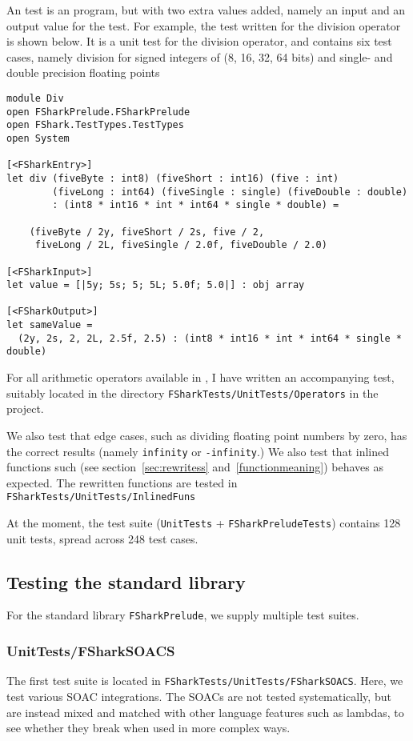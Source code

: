 An \fshark{} test is an \fshark{} program, but with two extra values added,
namely an input and an output value for the test. For example, the test written for the
division operator is shown below. It is a unit test for the division operator,
and contains six test cases, namely division for signed integers of (8, 16, 32,
64 bits) and single- and double precision floating points
\begin{verbatim}
module Div
open FSharkPrelude.FSharkPrelude
open FShark.TestTypes.TestTypes
open System

[<FSharkEntry>]
let div (fiveByte : int8) (fiveShort : int16) (five : int) 
        (fiveLong : int64) (fiveSingle : single) (fiveDouble : double) 
        : (int8 * int16 * int * int64 * single * double) =

    (fiveByte / 2y, fiveShort / 2s, five / 2, 
     fiveLong / 2L, fiveSingle / 2.0f, fiveDouble / 2.0)

[<FSharkInput>]
let value = [|5y; 5s; 5; 5L; 5.0f; 5.0|] : obj array

[<FSharkOutput>]
let sameValue = 
  (2y, 2s, 2, 2L, 2.5f, 2.5) : (int8 * int16 * int * int64 * single * double)
\end{verbatim}
For all arithmetic operators available in \fshark{}, I have written an
accompanying test, suitably located in the directory
\texttt{FSharkTests/UnitTests/Operators} in the \fshark{} project.

We also test that edge cases, such as dividing floating point numbers by zero,
has the correct results (namely \texttt{infinity} or \texttt{-infinity}.)
We also test that \fshark{} inlined functions such (see
section~\ref{sec:rewritess} and~\ref{functionmeaning}) behaves as expected.
The rewritten functions are tested in \texttt{FSharkTests/UnitTests/InlinedFuns}

At the moment, the \fshark{} test suite (\texttt{UnitTests} +
\texttt{FSharkPreludeTests}) contains 128 unit tests, spread across 248 test cases.


\subsection{Testing the \fshark{} standard library}
For the \fshark{} standard library \texttt{FSharkPrelude}, we supply multiple
test suites.
\subsubsection{UnitTests/FSharkSOACS}
The first test suite is located in \texttt{FSharkTests/UnitTests/FSharkSOACS}.
Here, we test various SOAC integrations. The SOACs are not tested
systematically, but are instead mixed and matched with other \fshark{} language
features such as lambdas, to see whether they break when used in more complex ways.  

